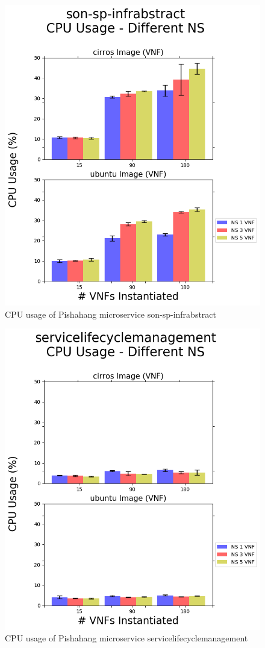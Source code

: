 \begin{figure}
\centering
\includegraphics[width=0.7\linewidth]{figures/scalability_graphs/Docker-Grouped-Cases/pishahang/son-sp-infrabstract-cpu-Mean-CPU-Cases}
\caption{CPU usage of Pishahang microservice son-sp-infrabstract}
\label{fig:pishson-mean-cpu-cases}
\end{figure}

\begin{figure}
\centering
\includegraphics[width=0.7\linewidth]{figures/scalability_graphs/Docker-Grouped-Cases/pishahang/servicelifecyclemanagement-cpu-Mean-CPU-Cases}
\caption{CPU usage of Pishahang microservice servicelifecyclemanagement}
\label{fig:pishslm-mean-cpu-cases}
\end{figure}


